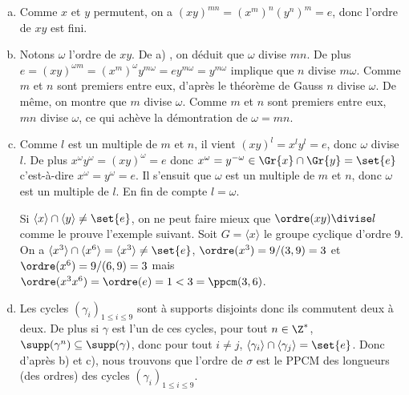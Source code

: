\begin{enumerate}[a)]
\item 
  Comme $x$ et $y$ permutent, on a $(xy)^{mn} = (x^m)^n(y^n)^m = e$, donc l'ordre de 
  $xy$ est fini.

\item 
  Notons $\omega$ l'ordre de $xy$. De a) , on déduit que 
  $\omega$ divise $mn$. De plus  
  $e =(xy)^{\omega m} = (x^m)^\omega y^{m\omega} = e y^{m\omega} = y^{m\omega}$ 
  implique que $n$ divise $m\omega$. Comme $m$ et $n$ sont premiers entre eux,
  d'après le théorème de Gauss $n$ divise $\omega$. De même, on montre que
  $m$ divise $\omega$. Comme $m$ et $n$ sont premiers entre eux, $mn$ divise
  $\omega$, ce qui achève la démontration de $\omega = mn$.  

\item 
  Comme $l$ est un multiple de $m$ et $n$, il vient $(xy)^l = x^l y^l = e$, donc
  $\omega$ divise $l$. De plus $x^\omega y^\omega = (xy)^\omega = e$  donc
  $x^\omega = y^{-\omega}\in\Gr{x}\cap \Gr{y} = \set{e}$ c'est-à-dire $x^\omega =
  y^\omega = e$. Il s'ensuit que $\omega$ est un multiple de $m$ et $n$, donc
  $\omega$ est un multiple de $l$.  En fin de compte $l = \omega$.
  
  Si $\langle x \rangle\cap\langle y \rangle\neq\set{e}$,
  on ne peut faire mieux que $\ordre(xy)\divise l$ comme le prouve l'exemple
  suivant. Soit $G = \langle x \rangle$ le groupe cyclique d'ordre $9$. On a
  $\langle x^3\rangle\cap\langle x^6\rangle = \langle x^3\rangle\neq\set{e}$,
  $\ordre(x^3) = 9/(3,9) = 3$ et $\ordre(x^6) = 9/(6,9) = 3$ mais
  $\ordre(x^3 x^6)=\ordre(e) = 1 < 3 = \ppcm(3,6)$.

\item 
  Les cycles $(\gamma_i)_{1\leq i\leq 9}$ sont à supports disjoints
  donc ils commutent deux à deux. De plus si $\gamma$ est l'un de ces cycles,
  pour tout $n\in\Z^*$, $\supp(\gamma^n)\subseteq\supp(\gamma)$, donc pour tout
  $i\neq j$, $\langle\gamma_i\rangle\cap\langle\gamma_j\rangle=\set{e}$. Donc
  d'après b) et c), nous trouvons que l'ordre de $\sigma$ est le PPCM des
  longueurs (des ordres) des cycles $(\gamma_i)_{1\leq i\leq 9}$.
\end{enumerate}

